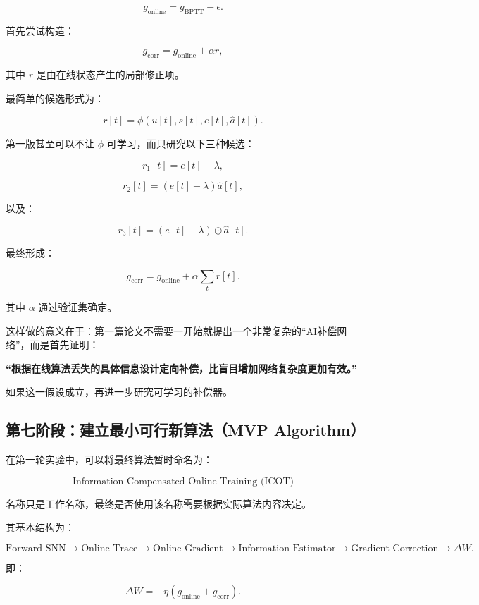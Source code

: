 \documentclass[journal,12pt,onecolumn]{IEEEtran}
\begin{document}
\[
g_{\mathrm{online}}
=
g_{\mathrm{BPTT}}
-
\epsilon.
\]

首先尝试构造：

\[
g_{\mathrm{corr}}
=
g_{\mathrm{online}}
+
\alpha r,
\]

其中 \(r\) 是由在线状态产生的局部修正项。

最简单的候选形式为：

\[
r[t]
=
\phi(u[t],s[t],e[t],\hat a[t]).
\]

第一版甚至可以不让 \(\phi\) 可学习，而只研究以下三种候选：

\[
r_1[t]=e[t]-\lambda,
\]

\[
r_2[t]=
(e[t]-\lambda)\hat a[t],
\]

以及：

\[
r_3[t]
=
\left(
e[t]-\lambda
\right)
\odot
\hat a[t].
\]

最终形成：

\[
g_{\mathrm{corr}}
=
g_{\mathrm{online}}
+
\alpha
\sum_t r[t].
\]

其中 \(\alpha\) 通过验证集确定。

这样做的意义在于：第一篇论文不需要一开始就提出一个非常复杂的“AI补偿网络”，而是首先证明：

\begin{center}
\textbf{“根据在线算法丢失的具体信息设计定向补偿，比盲目增加网络复杂度更加有效。”}
\end{center}

如果这一假设成立，再进一步研究可学习的补偿器。


\subsection{第七阶段：建立最小可行新算法（MVP Algorithm）}

在第一轮实验中，可以将最终算法暂时命名为：

\[
\boxed{\text{Information-Compensated Online Training (ICOT)}}
\]

名称只是工作名称，最终是否使用该名称需要根据实际算法内容决定。

其基本结构为：

\[
\text{Forward SNN}
\rightarrow
\text{Online Trace}
\rightarrow
\text{Online Gradient}
\rightarrow
\text{Information Estimator}
\rightarrow
\text{Gradient Correction}
\rightarrow
\Delta W.
\]

即：

\[
\Delta W
=
-\eta
\left(
g_{\mathrm{online}}
+
g_{\mathrm{corr}}
\right).
\]
\end{document}
